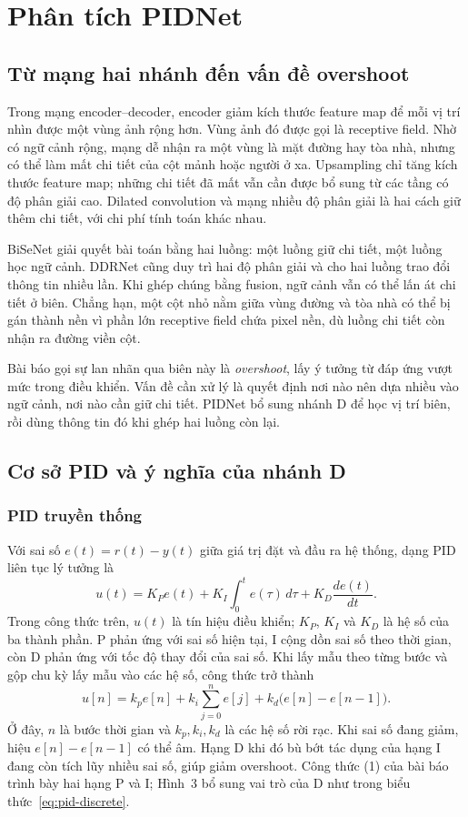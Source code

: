\chapter{Phân tích PIDNet}
\section{Từ mạng hai nhánh đến vấn đề overshoot}
Trong mạng encoder--decoder, encoder giảm kích thước feature map để mỗi vị trí nhìn được một vùng ảnh rộng hơn. Vùng ảnh đó được gọi là receptive field. Nhờ có ngữ cảnh rộng, mạng dễ nhận ra một vùng là mặt đường hay tòa nhà, nhưng có thể làm mất chi tiết của cột mảnh hoặc người ở xa. Upsampling chỉ tăng kích thước feature map; những chi tiết đã mất vẫn cần được bổ sung từ các tầng có độ phân giải cao. Dilated convolution và mạng nhiều độ phân giải là hai cách giữ thêm chi tiết, với chi phí tính toán khác nhau.

BiSeNet \cite{bisenet} giải quyết bài toán bằng hai luồng: một luồng giữ chi tiết, một luồng học ngữ cảnh. DDRNet \cite{ddrnet} cũng duy trì hai độ phân giải và cho hai luồng trao đổi thông tin nhiều lần. Khi ghép chúng bằng fusion, ngữ cảnh vẫn có thể lấn át chi tiết ở biên. Chẳng hạn, một cột nhỏ nằm giữa vùng đường và tòa nhà có thể bị gán thành nền vì phần lớn receptive field chứa pixel nền, dù luồng chi tiết còn nhận ra đường viền cột.

Bài báo gọi sự lan nhãn qua biên này là \emph{overshoot}, lấy ý tưởng từ đáp ứng vượt mức trong điều khiển. Vấn đề cần xử lý là quyết định nơi nào nên dựa nhiều vào ngữ cảnh, nơi nào cần giữ chi tiết. PIDNet bổ sung nhánh D để học vị trí biên, rồi dùng thông tin đó khi ghép hai luồng còn lại.

\section{Cơ sở PID và ý nghĩa của nhánh D}
\subsection{PID truyền thống}
Với sai số $e(t)=r(t)-y(t)$ giữa giá trị đặt và đầu ra hệ thống, dạng PID liên tục lý tưởng là
\begin{equation}
 u(t)=K_Pe(t)+K_I\int_0^t e(\tau)\,d\tau+K_D\frac{de(t)}{dt}.
 \label{eq:pid-continuous}
\end{equation}
Trong công thức trên, $u(t)$ là tín hiệu điều khiển; $K_P$, $K_I$ và $K_D$ là hệ số của ba thành phần. P phản ứng với sai số hiện tại, I cộng dồn sai số theo thời gian, còn D phản ứng với tốc độ thay đổi của sai số. Khi lấy mẫu theo từng bước và gộp chu kỳ lấy mẫu vào các hệ số, công thức trở thành
\begin{equation}
 u[n]=k_pe[n]+k_i\sum_{j=0}^{n}e[j]
      +k_d\big(e[n]-e[n-1]\big).
 \label{eq:pid-discrete}
\end{equation}
Ở đây, $n$ là bước thời gian và $k_p,k_i,k_d$ là các hệ số rời rạc. Khi sai số đang giảm, hiệu $e[n]-e[n-1]$ có thể âm. Hạng D khi đó bù bớt tác dụng của hạng I đang còn tích lũy nhiều sai số, giúp giảm overshoot. Công thức (1) của bài báo trình bày hai hạng P và I; Hình~3 bổ sung vai trò của D như trong biểu thức~\eqref{eq:pid-discrete}.

